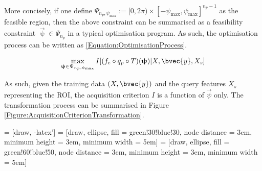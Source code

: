 			More concisely, if one define $\Psi_{n_{p}, \psi_{\mathrm{max}}} := [0, 2 \pi) \times [-\psi_{\mathrm{max}}, \psi_{\mathrm{max}}]^{n_{p} - 1}$ as the feasible region, then the above constraint can be summarised as a feasibility constraint $\vec{\uppsi} \in \Psi_{n_{p}}$ in a typical optimisation program. As such, the optimisation process can be written as \eqref{Equation:OptimisationProcess}.
			
			\begin{equation}
				\max_{\vec{\uppsi} \in \Psi_{n_{p}, \psi_{\mathrm{max}}}} I[(f_{e} \circ q_{p} \circ T)(\vec{\uppsi}) | X, \bvec{y}, X_{s}]				
			\label{Equation:OptimisationProcess}
			\end{equation}
		
			As such, given the training data $(X, \bvec{y})$ and the query features $X_{s}$ representing the ROI, the acquisition criterion $I$ is a function of $\vec{\psi}$ only. The transformation process can be summarised in Figure \ref{Figure:AcquisitionCriterionTransformation}.
			
			 = [draw, -latex']
			 = [draw, ellipse, fill = green!30!blue!30, node distance = 3cm, minimum height = 3em,  minimum width = 5em]
			 = [draw, ellipse, fill = green!60!blue!50, node distance = 3cm, minimum height = 3em,  minimum width = 5em]
			
